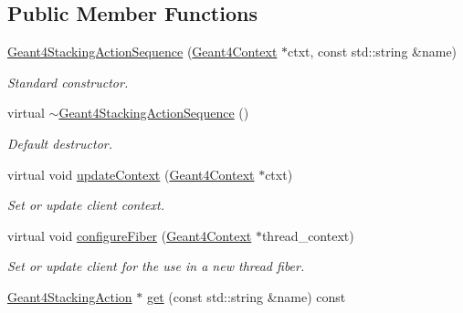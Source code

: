 \subsection*{Public Member Functions}
\begin{DoxyCompactItemize}
\item 
\hyperlink{class_d_d4hep_1_1_simulation_1_1_geant4_stacking_action_sequence_a1ddc69cd00ed31d6da76929243f43c84}{Geant4StackingActionSequence} (\hyperlink{class_d_d4hep_1_1_simulation_1_1_geant4_context}{Geant4Context} $\ast$ctxt, const std::string \&name)
\begin{DoxyCompactList}\small\item\em Standard constructor. \item\end{DoxyCompactList}\item 
virtual \hyperlink{class_d_d4hep_1_1_simulation_1_1_geant4_stacking_action_sequence_af4cadf550f682910d7eee326802859d8}{$\sim$Geant4StackingActionSequence} ()
\begin{DoxyCompactList}\small\item\em Default destructor. \item\end{DoxyCompactList}\item 
virtual void \hyperlink{class_d_d4hep_1_1_simulation_1_1_geant4_stacking_action_sequence_a093447274a6d135bc1d69fe96ed0961c}{updateContext} (\hyperlink{class_d_d4hep_1_1_simulation_1_1_geant4_context}{Geant4Context} $\ast$ctxt)
\begin{DoxyCompactList}\small\item\em Set or update client context. \item\end{DoxyCompactList}\item 
virtual void \hyperlink{class_d_d4hep_1_1_simulation_1_1_geant4_stacking_action_sequence_af292bcae909cc6b7bc4a94c0f0e07b9c}{configureFiber} (\hyperlink{class_d_d4hep_1_1_simulation_1_1_geant4_context}{Geant4Context} $\ast$thread\_\-context)
\begin{DoxyCompactList}\small\item\em Set or update client for the use in a new thread fiber. \item\end{DoxyCompactList}\item 
\hyperlink{class_d_d4hep_1_1_simulation_1_1_geant4_stacking_action}{Geant4StackingAction} $\ast$ \hyperlink{class_d_d4hep_1_1_simulation_1_1_geant4_stacking_action_sequence_a1f5acccf1180d7c6a6ff9c919bd96384}{get} (const std::string \&name) const 

\end{DoxyCompactItemize}
